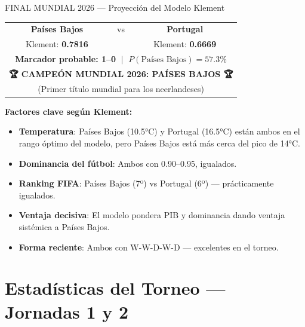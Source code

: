 \documentclass[11pt,a4paper]{article}
\begin{document}
\begin{prediccioncaja}{FINAL MUNDIAL 2026 — Proyección del Modelo Klement}

\begin{center}
\begin{tabular}{ccc}
  {\LARGE\bfseries Países Bajos} & {\Huge vs} & {\Large\bfseries Portugal} \\[6pt]
  Klement: \textbf{0.7816} & & Klement: \textbf{0.6669} \\[6pt]
  \multicolumn{3}{c}{\textbf{Marcador probable: 1--0} $\;|\;$ $P(\text{Países Bajos}) = 57.3\%$} \\[4pt]
  \multicolumn{3}{c}{\textbf{🏆 CAMPEÓN MUNDIAL 2026: PAÍSES BAJOS 🏆}} \\[2pt]
  \multicolumn{3}{c}{\small (Primer título mundial para los neerlandeses)} \\
\end{tabular}
\end{center}

\vspace{0.3cm}
\textbf{Factores clave según Klement:}
\begin{itemize}[itemsep=2pt]
\item \textbf{Temperatura}: Países Bajos (10.5°C) y Portugal (16.5°C) están ambos en el rango óptimo del modelo, pero Países Bajos está más cerca del pico de 14°C.
\item \textbf{Dominancia del fútbol}: Ambos con 0.90--0.95, igualados.
\item \textbf{Ranking FIFA}: Países Bajos (7º) vs Portugal (6º) --- prácticamente igualados.
\item \textbf{Ventaja decisiva}: El modelo pondera PIB y dominancia dando ventaja sistémica a Países Bajos.
\item \textbf{Forma reciente}: Ambos con W-W-D-W-D --- excelentes en el torneo.
\end{itemize}
\end{prediccioncaja}

\newpage

\section{Estadísticas del Torneo — Jornadas 1 y 2}
\end{document}
